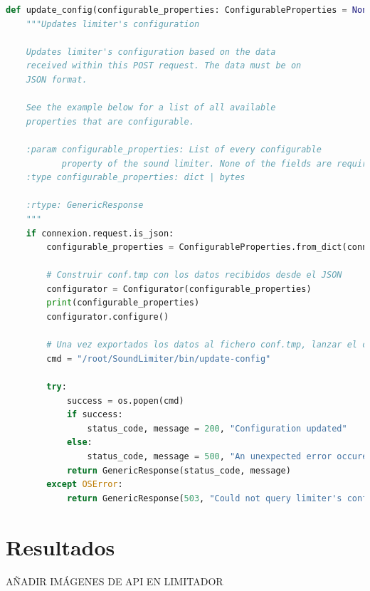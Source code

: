 \begin{lstlisting}[language=python, caption={\glsname{API-REST} del LM11}, label={lst:lms11-api-conf}]
def update_config(configurable_properties: ConfigurableProperties = None):
    """Updates limiter's configuration

    Updates limiter's configuration based on the data
    received within this POST request. The data must be on
    JSON format.

    See the example below for a list of all available
    properties that are configurable.

    :param configurable_properties: List of every configurable
           property of the sound limiter. None of the fields are required.
    :type configurable_properties: dict | bytes

    :rtype: GenericResponse
    """
    if connexion.request.is_json:
        configurable_properties = ConfigurableProperties.from_dict(connexion.request.get_json())

        # Construir conf.tmp con los datos recibidos desde el JSON
        configurator = Configurator(configurable_properties)
        print(configurable_properties)
        configurator.configure()

        # Una vez exportados los datos al fichero conf.tmp, lanzar el configurador.
        cmd = "/root/SoundLimiter/bin/update-config"

        try:
            success = os.popen(cmd)
            if success:
                status_code, message = 200, "Configuration updated"
            else:
                status_code, message = 500, "An unexpected error occured during the configuration"
            return GenericResponse(status_code, message)
        except OSError:
            return GenericResponse(503, "Could not query limiter's configurator service")
\end{lstlisting}

\section{Resultados}

AÑADIR IMÁGENES DE API EN LIMITADOR
